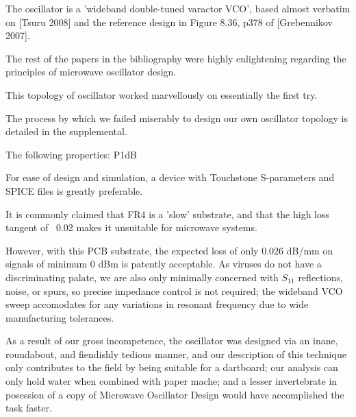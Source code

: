 \documentclass[fleqn,10pt]{article}
\begin{document}
\clearpage
\begin{multicols}{1}

\noindent{}
%


The oscillator is a 'wideband double-tuned varactor VCO', based almost verbatim on [Tsuru 2008] and the reference design in Figure 8.36, p378 of [Grebennikov 2007]. 

The rest of the papers in the bibliography were highly enlightening regarding the principles of microwave oscillator design.

This topology of oscillator worked marvellously on essentially the first try. 

The process by which we failed miserably to design our own oscillator topology is detailed in the supplemental.

The following properties: P1dB

For ease of design and simulation, a device with Touchstone S-parameters and SPICE files is greatly preferable.

It is commonly claimed that FR4 is a 'slow' substrate, and that the high loss tangent of ~0.02 makes it unsuitable for microwave systems.

However, with this PCB substrate, the expected loss of only 0.026 dB/mm on signals of minimum 0 dBm is patently acceptable. As viruses do not have a discriminating palate, we are also only minimally concerned with $S_{11}$ reflections, noise, or spurs, so precise impedance control is not required; the wideband VCO sweep accomodates for any variations in resonant frequency due to wide manufacturing tolerances.

As a result of our gross incompetence, the oscillator was designed via an inane, roundabout, and fiendishly tedious manner, and our description of this technique only contributes to the field by being suitable for a dartboard; our analysis can only hold water when combined with paper mache; and a lesser invertebrate in posession of a copy of Microwave Oscillator Design would have accomplished the task faster.


\end{multicols}
\end{document}
